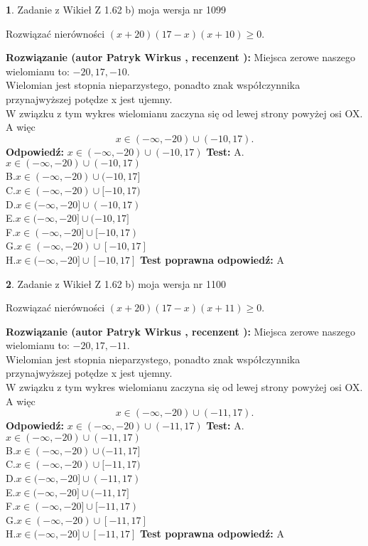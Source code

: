 \documentclass[12pt, a4paper]{article}
\theoremstyle{definition} %
\newtheorem{zad}{}
\newcommand{\zadStart}[1]{\begin{zad}#1\newline}
\newcommand{\zadStop}{\end{zad}}
\newcommand{\rozwStart}[2]{\noindent \textbf{Rozwiązanie (autor #1 , recenzent #2): }\newline}
\newcommand{\rozwStop}{\newline}
\newcommand{\odpStart}{\noindent \textbf{Odpowiedź:}\newline}
\newcommand{\odpStop}{\newline}
\newcommand{\testStart}{\noindent \textbf{Test:}\newline}
\newcommand{\testStop}{\newline}
\newcommand{\kluczStart}{\noindent \textbf{Test poprawna odpowiedź:}\newline}
\newcommand{\kluczStop}{\newline}
\begin{document}
\zadStart{Zadanie z Wikieł Z 1.62 b) moja wersja nr 1099}

Rozwiązać nierówności $(x+20)(17-x)(x+10)\ge0$.
\zadStop
\rozwStart{Patryk Wirkus}{}
Miejsca zerowe naszego wielomianu to: $-20, 17, -10$.\\
Wielomian jest stopnia nieparzystego, ponadto znak współczynnika przy\linebreak najwyższej potędze x jest ujemny.\\ W związku z tym wykres wielomianu zaczyna się od lewej strony powyżej osi OX. A więc $$x \in (-\infty,-20) \cup (-10,17).$$
\rozwStop
\odpStart
$x \in (-\infty,-20) \cup (-10,17)$
\odpStop
\testStart
A.$x \in (-\infty,-20) \cup (-10,17)$\\
B.$x \in (-\infty,-20) \cup (-10,17]$\\
C.$x \in (-\infty,-20) \cup [-10,17)$\\
D.$x \in (-\infty,-20] \cup (-10,17)$\\
E.$x \in (-\infty,-20] \cup (-10,17]$\\
F.$x \in (-\infty,-20] \cup [-10,17)$\\
G.$x \in (-\infty,-20) \cup [-10,17]$\\
H.$x \in (-\infty,-20] \cup [-10,17]$
\testStop
\kluczStart
A
\kluczStop



\zadStart{Zadanie z Wikieł Z 1.62 b) moja wersja nr 1100}

Rozwiązać nierówności $(x+20)(17-x)(x+11)\ge0$.
\zadStop
\rozwStart{Patryk Wirkus}{}
Miejsca zerowe naszego wielomianu to: $-20, 17, -11$.\\
Wielomian jest stopnia nieparzystego, ponadto znak współczynnika przy\linebreak najwyższej potędze x jest ujemny.\\ W związku z tym wykres wielomianu zaczyna się od lewej strony powyżej osi OX. A więc $$x \in (-\infty,-20) \cup (-11,17).$$
\rozwStop
\odpStart
$x \in (-\infty,-20) \cup (-11,17)$
\odpStop
\testStart
A.$x \in (-\infty,-20) \cup (-11,17)$\\
B.$x \in (-\infty,-20) \cup (-11,17]$\\
C.$x \in (-\infty,-20) \cup [-11,17)$\\
D.$x \in (-\infty,-20] \cup (-11,17)$\\
E.$x \in (-\infty,-20] \cup (-11,17]$\\
F.$x \in (-\infty,-20] \cup [-11,17)$\\
G.$x \in (-\infty,-20) \cup [-11,17]$\\
H.$x \in (-\infty,-20] \cup [-11,17]$
\testStop
\kluczStart
A
\kluczStop
\end{document}
